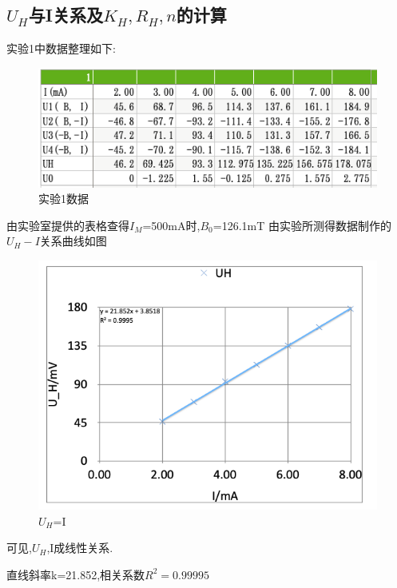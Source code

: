 \documentclass{thuemp}
\begin{document}
\subsection{$U_{H}$与I关系及$K_{H},R_{H},n$的计算}
实验1中数据整理如下:
\begin{figure}[H]
	\centering
	\includegraphics[width=0.8\linewidth]{./image/n1.png}
	\caption{实验1数据} \label{fig:eg}
\end{figure}
由实验室提供的表格查得$I_{M}$=500mA时,$B_{0}$=126.1mT
由实验所测得数据制作的$U_{H}-I$关系曲线如图
\begin{figure}[H]
	\centering
	\includegraphics[width=0.8\linewidth]{./image/3.png}
	\caption{$U_{H}$=I} \label{fig:eg}
\end{figure}
可见,$U_{H}$,I成线性关系.

直线斜率k=21.852,相关系数$R^2=0.99995$
\end{document}
